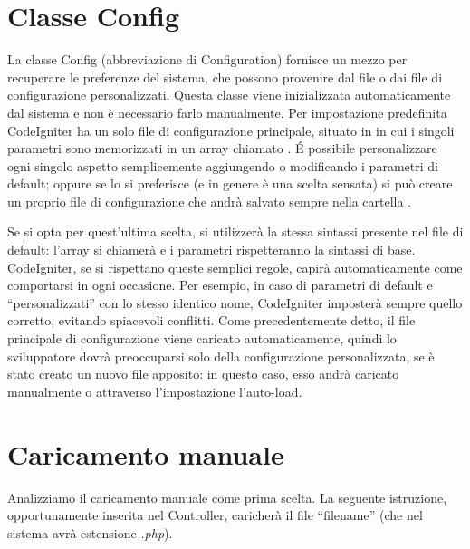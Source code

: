 \section{Classe Config}
\label{class:config}

La classe Config (abbreviazione di Configuration) fornisce un mezzo per recuperare le preferenze del sistema, che possono provenire dal file  o dai file di configurazione personalizzati. Questa classe viene inizializzata automaticamente dal sistema e non è necessario farlo manualmente. Per impostazione predefinita CodeIgniter ha un solo file di configurazione principale, situato in  in cui i singoli parametri sono memorizzati in un array chiamato . \'E possibile personalizzare ogni singolo aspetto semplicemente aggiungendo o modificando i parametri di default; oppure se lo si preferisce (e in genere è una scelta sensata) si può creare un proprio file di configurazione che andrà salvato sempre nella cartella .

Se si opta per quest'ultima scelta, si utilizzerà la stessa sintassi presente nel file di default: l'array si chiamerà  e i parametri rispetteranno la sintassi di base. CodeIgniter, se si rispettano queste semplici regole, capirà automaticamente come comportarsi in ogni occasione. Per esempio, in caso di parametri di default e ``personalizzati'' con lo stesso identico nome, CodeIgniter imposterà sempre quello corretto, evitando spiacevoli conflitti. Come precedentemente detto, il file principale di configurazione viene caricato automaticamente, quindi lo sviluppatore dovrà preoccuparsi solo della configurazione personalizzata, se è stato creato un nuovo file apposito: in questo caso, esso andrà caricato manualmente o attraverso l'impostazione l'auto-load.

\section*{Caricamento manuale}
Analizziamo il caricamento manuale come prima scelta. La seguente istruzione, opportunamente inserita nel Controller, caricherà il file ``filename'' (che nel sistema avrà estensione \emph{.php}).


